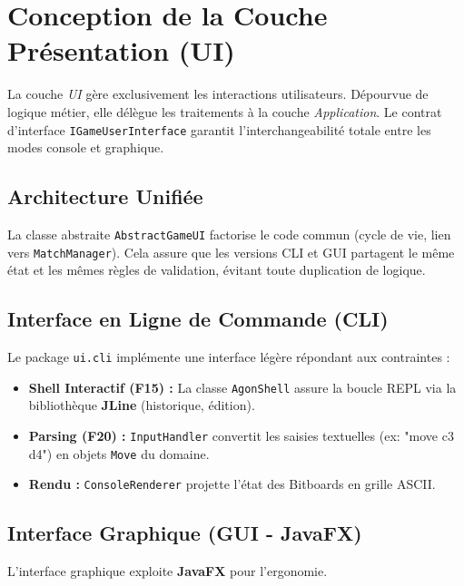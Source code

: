\documentclass[9pt]{extarticle} %
\begin{document}
\section{Conception de la Couche Présentation (UI)}

La couche \textit{UI} gère exclusivement les interactions utilisateurs. Dépourvue de logique métier, elle délègue les traitements à la couche \textit{Application}. Le contrat d'interface \texttt{IGameUserInterface} garantit l'interchangeabilité totale entre les modes console et graphique.


\subsection{Architecture Unifiée}
La classe abstraite \texttt{AbstractGameUI} factorise le code commun (cycle de vie, lien vers \texttt{MatchManager}). Cela assure que les versions CLI et GUI partagent le même état et les mêmes règles de validation, évitant toute duplication de logique.

\subsection{Interface en Ligne de Commande (CLI)}
Le package \texttt{ui.cli} implémente une interface légère répondant aux contraintes :
\begin{itemize}
    \item \textbf{Shell Interactif (F15) :} La classe \texttt{AgonShell} assure la boucle REPL via la bibliothèque \textbf{JLine} (historique, édition).
    \item \textbf{Parsing (F20) :} \texttt{InputHandler} convertit les saisies textuelles (ex: "move c3 d4") en objets \texttt{Move} du domaine.
    \item \textbf{Rendu :} \texttt{ConsoleRenderer} projette l'état des Bitboards en grille ASCII.
\end{itemize}


\subsection{Interface Graphique (GUI - JavaFX)}
L'interface graphique exploite \textbf{JavaFX} pour l'ergonomie.
\end{document}
